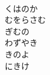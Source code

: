 \documentclass[10pt,b5j]{tarticle} %
\begin{document}
\begin{enumerate}
\begin{minipage}[c]{\blocksize}
        \vspace{\linespace}
        \item~\\
        くはのか\\
        むをらさむ\\
        ぎむの\\
        わずやき\\
        きのよ\\
        にきけ
    
    \end{minipage}
\end{enumerate} %
\end{document}
